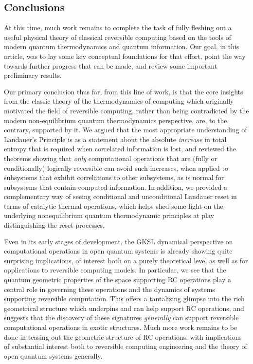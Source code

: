 \documentclass[preprints,article,accept,moreauthors,pdftex]{Definitions/mdpi}
\begin{document}
\begin{paracol}{2}

\section{Conclusions}
\label{sec:conc}

At this time, much work remains to complete the task of fully fleshing out a useful physical theory of classical reversible computing based on the tools of modern quantum thermodynamics and quantum information. Our goal, in this article, was to lay some key conceptual foundations for that effort, point the way towards further progress that can be made, and review some important preliminary results.

Our primary conclusion thus far, from this line of work, is that the core insights from the classic theory of the thermodynamics of computing which originally motivated the field of reversible computing, rather than being contradicted by the modern non-equilibrium quantum thermodynamics perspective, are, to the contrary, supported by it.  We argued that the most appropriate understanding of Landauer's Principle is as a statement about the absolute \textit{increase} in total entropy that is required when correlated information is lost, and reviewed the theorems showing that \emph{only} computational operations that are (fully or conditionally) logically reversible can avoid such increases, when applied to subsystems that exhibit correlations to other subsystems, as is normal for subsystems that contain computed information. In addition, we provided a complementary way of seeing conditional and unconditional Landauer reset in terms of catalytic thermal operations, which helps shed some light on the underlying nonequilibrium quantum thermodynamic principles at play distinguishing the reset processes.

Even in its early stages of development, the GKSL dynamical perspective on computational operations in open quantum systems is already showing quite surprising implications, of interest both on a purely theoretical level as well as for applications to reversible computing models. In particular, we see that the quantum geometric properties of the space supporting RC operations play a central role in governing these operations and the dynamics of systems supporting reversible computation. This offers a tantalizing glimpse into the rich geometrical structure which underpins and can help support RC operations, and suggests that the discovery of these signatures \emph{generally} can support reversible computational operations in exotic structures. Much more work remains to be done in teasing out the geometric structure of RC operations, with implications of substantial interest both to reversible computing engineering and the theory of open quantum systems generally.


\end{paracol}
\end{document}

